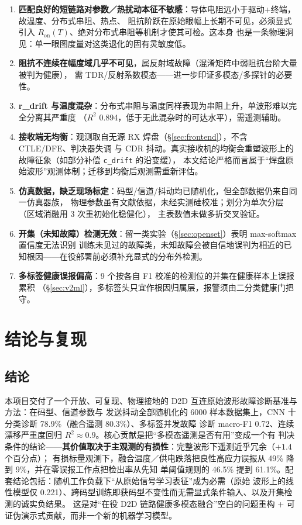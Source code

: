 \documentclass[11pt,a4paper,fontset=mac]{ctexart}
\begin{document}
\begin{enumerate}
\item \textbf{匹配良好的短链路对参数／热扰动本征不敏感}：导体电阻远小于驱动+终端，故温度、分布式串阻、热点、
阻抗阶跃在原始眼幅上长期不可见，必须显式引入 $R_\text{on}(T)$、绝对分布式串阻等机制才使其可检。这本身
也是一条物理洞见：单一眼图度量对这类退化的固有灵敏度低。
\item \textbf{阻抗不连续在幅度域几乎不可见}，属反射域故障（混淆矩阵中弱阻抗台阶大量被判为健康），
需 TDR/反射系数模态——进一步印证多模态/多探针的必要性。
\item \textbf{r\_drift 与温度混杂}：分布式串阻与温度同样表现为串阻上升，单波形难以完全分离其严重度
（$R^2$ 0.894，低于无此混杂时的可达水平），需遥测辅助。
\item \textbf{接收端无均衡}：观测取自无源 RX 焊盘（\S\ref{sec:frontend}），不含 CTLE/DFE、判决器失调
与 CDR 抖动。真实接收机的均衡会重塑波形上的故障征象（如部分补偿 \texttt{c\_drift} 的沿变缓），
本文结论严格而言属于“焊盘原始波形”观测体制；迁移到均衡后观测需重新评估。
\item \textbf{仿真数据，缺乏现场标定}：码型/信道/抖动均已随机化，但全部数据仍来自同一仿真器族，
物理参数虽有文献依据，未经实测硅校准；划分为单次分层（区域消融用 3 次重初始化稳健化），
主表数值未做多折交叉验证。
\item \textbf{开集（未知故障）检测无效}：留一类实验（\S\ref{sec:openset}）表明 max-softmax 置信度无法识别
训练未见过的故障类，未知故障会被自信地误判为相近的已知根因——在役部署前必须补充显式的分布外检测。
\item \textbf{多标签健康误报偏高}：9 个按各自 F1 校准的检测位的并集在健康样本上误报累积
（\S\ref{sec:v2ml}），多标签头只宜作根因归属层，报警须由二分类健康门把守。
\end{enumerate}

\section{结论与复现}

\subsection{结论}
本项目交付了一个开放、可复现、物理接地的 D2D 互连原始波形故障诊断基准与方法：在码型、信道参数与
发送抖动全部随机化的 6000 样本数据集上，CNN 十分类诊断 78.9\%（融合遥测 80.3\%）、多标签并发故障
诊断 macro-F1 0.72、连续漂移严重度回归 $R^2\approx0.9$。核心贡献是把“多模态遥测是否有用”变成一个有
判决条件的结论——\textbf{其价值取决于主观测的有损性}：完整波形下遥测近乎冗余（$+1.4$ 个百分点）；
有损标量观测下，融合温度／供电跌落把良性高应力误报从 49\% 降到 9\%，并在零误报工作点把检出率从先知
单阈值规则的 46.5\% 提到 61.1\%。配套结论包括：随机工作负载下“从原始信号学习表征”成为必需（原始
波形上的线性模型仅 0.221）、跨码型训练即获码型不变性而无需显式条件输入、以及开集检测的诚实负结果。
这是对“在役 D2D 链路健康多模态融合”空白的问题重构 + 可证伪演示式贡献，而非一个新的机器学习模型。
\end{document}
